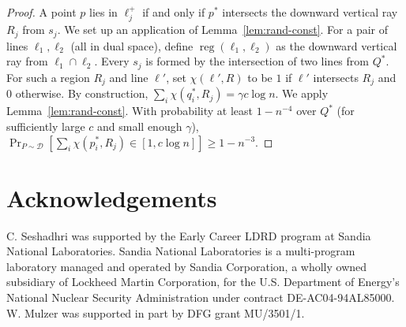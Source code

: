 \documentclass[letterpaper,11pt]{article}
\DeclareMathOperator{\reg}{reg}
\newcommand{\cD}{\mathcal{D}}
\begin{document}
\begin{proof} 
A point $p$ lies in $\ell_j^+$ if
and only if $p^*$
intersects the downward 
vertical ray $R_j$ from $s_j$.
We set up an application of 
Lemma~\ref{lem:rand-const}. 
For a pair of lines $\ell_1, \ell_2$ 
(all in dual space), define 
$\reg(\ell_1,\ell_2)$ as 
the downward vertical ray
from $\ell_1 \cap \ell_2$. 
Every $s_j$ 
is formed by the intersection 
of two lines from $Q^*$. For 
such a region $R_j$
and line $\ell'$, set 
$\chi(\ell',R)$ to be $1$ if 
$\ell'$ intersects $R_j$
and $0$ otherwise.
By construction, 
$\sum_i \chi(q^*_i, R_j) = \gamma c\log n$.
We apply Lemma~\ref{lem:rand-const}. 
With probability at least 
$1-n^{-4}$ over $Q^*$ (for sufficiently 
large $c$ and
small enough $\gamma$),
$\Pr_{P \sim \cD}[\sum_i \chi(p^*_i,R_j) \in [1, c\log n]] \geq 1 - n^{-3}$.
\end{proof}

\section*{Acknowledgements} \label{sec:ack}

C. Seshadhri was supported 
by the Early Career LDRD 
program at Sandia National
Laboratories. Sandia National 
Laboratories is a multi-program laboratory
managed and operated by Sandia 
Corporation, a wholly owned subsidiary of
Lockheed Martin Corporation, for 
the U.S. Department of Energy's National
Nuclear Security Administration 
under contract DE-AC04-94AL85000.
W. Mulzer was supported in 
part by DFG grant MU/3501/1.



\end{document}
